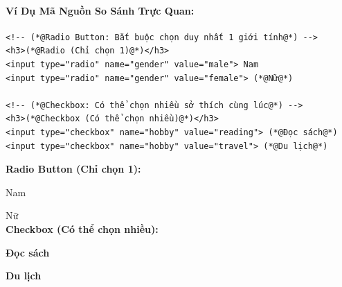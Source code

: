\paragraph{Ví Dụ Mã Nguồn So Sánh Trực Quan:}

\begin{codeWindow}
\begin{lstlisting}[language=HTML5]
<!-- (*@Radio Button: Bắt buộc chọn duy nhất 1 giới tính@*) -->
<h3>(*@Radio (Chỉ chọn 1)@*)</h3>
<input type="radio" name="gender" value="male"> Nam  
<input type="radio" name="gender" value="female"> (*@Nữ@*)  

<!-- (*@Checkbox: Có thể chọn nhiều sở thích cùng lúc@*) -->
<h3>(*@Checkbox (Có thể chọn nhiều)@*)</h3>
<input type="checkbox" name="hobby" value="reading"> (*@Đọc sách@*)  
<input type="checkbox" name="hobby" value="travel"> (*@Du lịch@*)  
\end{lstlisting}
\end{codeWindow}

\begin{browserWindow}
\sffamily\small
\textbf{Radio Button (Chỉ chọn 1):} \\[4pt]
 \; Nam \qquad
{} \; Nữ \\[10pt]
\textbf{Checkbox (Có thể chọn nhiều):} \\[4pt]
 \; \textbf{Đọc sách} \qquad
{} \; \textbf{Du lịch}
\end{browserWindow}

